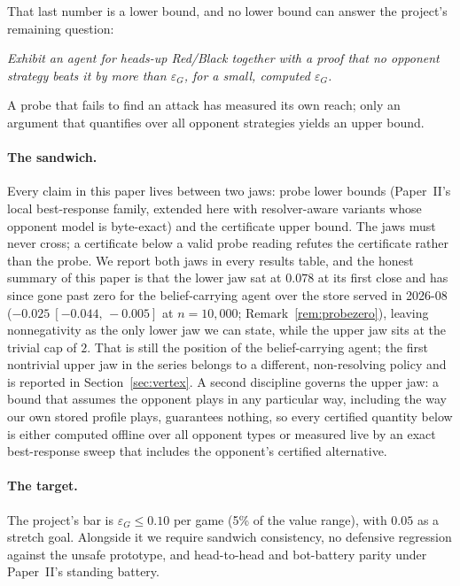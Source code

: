 \documentclass[11pt]{article}
\theoremstyle{plain}
\theoremstyle{definition}
\theoremstyle{remark}
\newcommand{\game}{\ensuremath{G}}
\newcommand{\epsG}{\ensuremath{\varepsilon_{\game}}}
\begin{document}
That last number is a lower bound, and no lower bound can answer the
project's remaining question:
\begin{center}
\emph{Exhibit an agent for heads-up Red/Black together with a proof
that no opponent strategy beats it by more than $\epsG$, for a small,
computed $\epsG$.}
\end{center}
A probe that fails to find an attack has measured its own reach; only
an argument that quantifies over all opponent strategies yields an
upper bound.

\paragraph{The sandwich.} Every claim in this paper lives between two
jaws: probe lower bounds (Paper~II's local best-response family,
extended here with resolver-aware variants whose opponent model is
byte-exact) and the certificate upper bound. The jaws must never
cross; a certificate below a valid probe reading refutes the
certificate rather than the probe. We report both jaws in every
results table, and the honest summary of this paper is that the lower
jaw sat at $0.078$ at its first close and has since gone past zero for
the belief-carrying agent over the store served in 2026-08
($-0.025\ [-0.044,\,-0.005]$ at
$n=10{,}000$; Remark~\ref{rem:probezero}), leaving nonnegativity as the
only lower jaw we can state, while the upper jaw sits at the trivial
cap of $2$. That is still the position of the belief-carrying agent;
the first nontrivial upper jaw in the series belongs to a different,
non-resolving policy and is reported in Section~\ref{sec:vertex}. A
second discipline governs the upper jaw: a bound that assumes the
opponent plays in any particular way, including the way our own stored
profile plays, guarantees nothing, so every certified quantity below
is either computed offline over all opponent types or measured live by
an exact best-response sweep that includes the opponent's certified
alternative.

\paragraph{The target.} The project's bar is $\epsG\le0.10$ per game
(5\% of the value range), with $0.05$ as a stretch goal. Alongside it
we require sandwich consistency, no defensive regression against the
unsafe prototype, and head-to-head and bot-battery parity under
Paper~II's standing battery.
\end{document}
